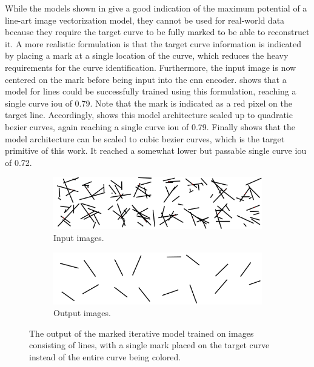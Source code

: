 While the models shown in  give a good indication of the maximum potential of a line-art image vectorization model, they cannot be used for real-world data because they require the target curve to be fully marked to be able to reconstruct it. A more realistic formulation is that the target curve information is indicated by placing a mark at a single location of the curve, which reduces the heavy requirements for the curve identification. Furthermore, the input image is now centered on the mark before being input into the \gls{cnn} encoder.  shows that a model for lines could be successfully trained using this formulation, reaching a single curve \gls{iou} of 0.79. Note that the mark is indicated as a red pixel on the target line. Accordingly,  shows this model architecture scaled up to quadratic bezier curves, again reaching a single curve \gls{iou} of 0.79. Finally  shows that the model architecture can be scaled to cubic bezier curves, which is the target primitive of this work. It reached a somewhat lower but passable single curve \gls{iou} of 0.72.

\begin{figure}
    \centering
    \begin{subfigure}{.45\textwidth}
        \includegraphics[width=\textwidth]{graphics/work-artifacts/iterative/312/input.png}
        \caption{Input images.}
    \end{subfigure}
    \begin{subfigure}{.45\textwidth}
        \includegraphics[width=\textwidth]{graphics/work-artifacts/iterative/312/recons.png}
        \caption{Output images.}
    \end{subfigure}
    \caption{The output of the marked iterative model trained on images consisting of lines, with a single mark placed on the target curve instead of the entire curve being colored.}
    \label{fig:iterative.312.recons}
\end{figure}

